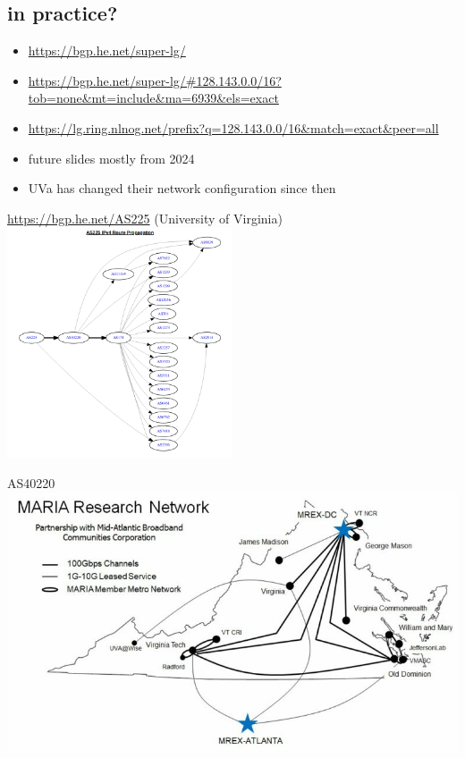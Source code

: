 
\subsection{in practice?}
\begin{frame}[fragile]{}
    \begin{itemize}
    \item \url{https://bgp.he.net/super-lg/}
    \item \url{https://bgp.he.net/super-lg/#128.143.0.0/16?tob=none&mt=include&ma=6939&els=exact}
    \item \url{https://lg.ring.nlnog.net/prefix?q=128.143.0.0/16&match=exact&peer=all}
    \item future slides mostly from 2024
    \item UVa has changed their network configuration since then
    \end{itemize}
\end{frame}

\begin{frame}{}
\url{https://bgp.he.net/AS225} (University of Virginia) \\
\includegraphics[width=0.5\textwidth]{../routing/as225-graph}
\end{frame}

\begin{frame}{AS40220}
\includegraphics[height=0.8\textheight]{../routing/MARIA-Network-BW-768x441.jpg}
\end{frame}

